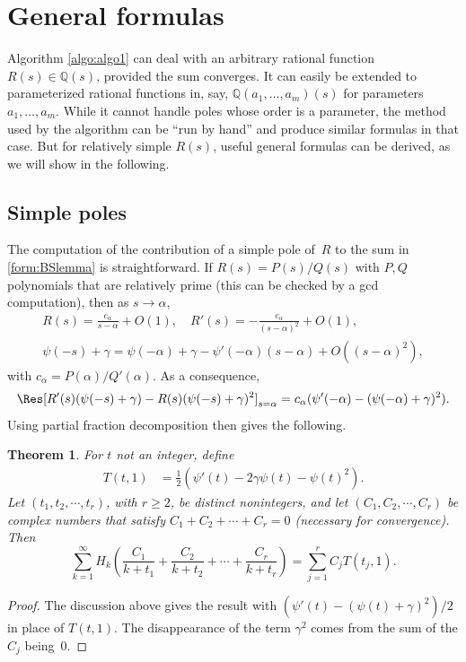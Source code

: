 \documentclass{article}
\newtheorem{theorem}{Theorem}
\theoremstyle{definition}
\begin{document}
\section{General formulas} \label{sec:theorems}
Algorithm \ref{algo:algo1} can deal with an arbitrary rational function~$R(s)\in\mathbb Q(s)$, provided the sum converges. It can easily be extended to parameterized rational functions in, say, $\mathbb Q(a_1,\dots,a_m)(s)$ for parameters~$a_1,\dots,a_m$. While it cannot handle poles whose order is a parameter, the method used by the algorithm can be ``run by hand'' and produce similar formulas in that case. But for relatively simple $R(s)$, useful general formulas can be derived, as we will show in the following.


\subsection{Simple poles}
The computation of the contribution of a simple pole of~$R$ to the sum in \cref{form:BSlemma} is straightforward. If $R(s)=P(s)/Q(s)$ with $P,Q$ polynomials that are relatively prime (this can be checked by a gcd computation), then as $s\rightarrow\alpha$,
\begin{gather*}
R(s)=\frac{c_\alpha}{s-\alpha}+O(1),\quad 
R'(s)=-\frac{c_\alpha}{(s-\alpha)^2}+O(1),\\
\psi(-s)+\gamma=\psi(-\alpha)+\gamma -\psi'(-\alpha)(s-\alpha)+O(
(s-\alpha)^2),
\end{gather*}
with $c_\alpha=P(\alpha)/Q'(\alpha)$. As a consequence,
\[
\Res[R'(s)(\psi(-s)+\gamma)-R(s)(\psi(-s)+\gamma)^2]_{s=\alpha}
=
c_\alpha(\psi'(-\alpha)-(\psi(-\alpha)+\gamma)^2).
\]
Using partial fraction decomposition then gives the following.
\begin{theorem} \label{thm:thm1}
For $t$ not an integer, define
\begin{align}
T(t,1) &= \frac{1}{2} \left(\psi'(t)-2\gamma\psi(t)-\psi(t)^2\right). \label{form:theorem4b}
\end{align}
Let $(t_1, t_2, \cdots, t_r)$, with $r \geq 2$, be distinct nonintegers, and let $(C_1, C_2, \cdots, C_r)$ be complex numbers that satisfy $C_1 + C_2 + \cdots + C_r = 0$ (necessary for convergence). Then
\begin{equation}
\sum_{k=1}^\infty H_k \left(\frac{C_1}{k+t_1} + \frac{C_2}{k+t_2} + \cdots + \frac{C_r}{k+t_r}\right) = \sum_{j=1}^r C_j T(t_j,1). \label{form:theoremx}
\end{equation}
\end{theorem}
\begin{proof}
The discussion above gives the result with $(\psi'(t)- (\psi(t)+\gamma)^2)/2$ in place of $T(t,1)$. The disappearance of the term $\gamma^2$ comes from the sum of the $C_j$ being~0.
\end{proof}
\end{document}
